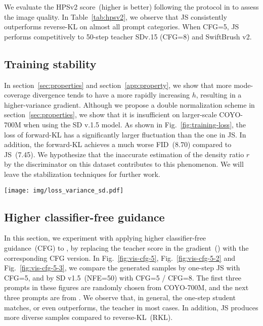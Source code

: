 We evaluate the HPSv2 score~(higher is better) following the protocol in \cite{dao2025swiftbrush} to assess the image quality. In Table~\ref{tab:hpsv2}, we observe that JS consistently outperforms reverse-KL on almost all prompt categories. When CFG=5, JS performs competitively to 50-step teacher SDv.15 (CFG=8) and SwiftBrush v2. 

\subsection{Training stability}

In section~\ref{sec:properties} and section~\ref{app:property}, we show that more mode-coverage divergence tends to have a more rapidly increasing $h$, resulting in a higher-variance gradient. Although we propose a double normalization scheme in section~\ref{sec:properties}, we show that it is insufficient on larger-scale COYO-700M when using the SD v.1.5 model. As shown in Fig.~\ref{fig:training-loss}, the loss of forward-KL has a significantly larger fluctuation than the one in JS. In addition, the forward-KL achieves a much worse FID~(8.70) compared to JS~(7.45). We hypothesize that the inaccurate estimation of the density ratio $r$ by the discriminator on this dataset contributes to this phenomenon. We will leave the stabilization techniques for further work.


\begin{figure*}[htbp]
    \centering
    \texttt{[image: img/loss\_variance\_sd.pdf]}
    \caption{Training dynamics of JS and forward-KL on COYO-700M.}
    \label{fig:training-loss}
\end{figure*}

\subsection{Higher classifier-free guidance}

In this section, we experiment with applying higher classifier-free guidance~(CFG) to \methodtext, by replacing the teacher score in the gradient~() with the corresponding CFG version. In Fig.~\ref{fig:vis-cfg-5}, Fig.~\ref{fig:vis-cfg-5-2} and Fig.~\ref{fig:vis-cfg-5-3}, we compare the generated samples by one-step JS with CFG=5, and by SD v1.5~(NFE=50) with CFG=5 / CFG=8. The first three prompts in these figures are randomly chosen from COYO-700M, and the next three prompts are from \cite{yin2024one}. We observe that, in general, the one-step student matches, or even outperforms, the teacher in most cases. In addition, JS produces more diverse samples compared to reverse-KL~(RKL).

